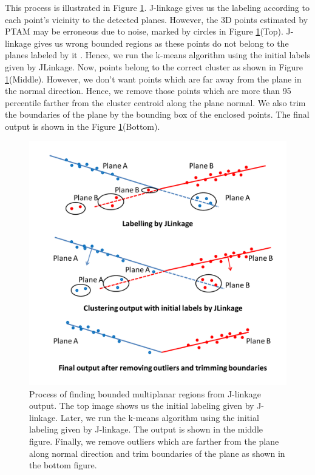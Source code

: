This process is illustrated in Figure \ref{fig:multiplane}. J-linkage
gives us the labeling according to each point's vicinity to the detected
planes. However, the 3D points estimated by PTAM may be erroneous due to noise,
marked by circles in Figure \ref{fig:multiplane}(Top). J-linkage gives us wrong bounded
regions as these points do not belong to the planes labeled by it . Hence, we
run the k-means algorithm using the initial labels given by JLinkage. Now, points  
belong to the correct cluster as shown in Figure \ref{fig:multiplane}(Middle). 
However, we don't want points which are far away from the plane in the normal direction.
Hence, we remove those points which are more than 95 percentile farther from the cluster 
centroid along the plane normal. We also trim the boundaries of the plane by
the bounding box of the enclosed points. The final output is shown in the
Figure \ref{fig:multiplane}(Bottom).

\begin{figure}[h!]
\centering
\includegraphics[width=\linewidth]{figures/multiplanar/multiplaneDetection}
\caption[Process of finding bounded multiplanar regions from J-linkage
output.]{Process of finding bounded multiplanar regions from J-linkage output.
The top image shows us the initial labeling given by J-linkage. Later, we run
the k-means algorithm using the initial labeling given by J-linkage. The output
is shown in the middle figure. Finally, we remove outliers which are farther
from the plane along normal direction and trim boundaries of the plane as shown
in the bottom figure.}
\label{fig:multiplane}
\end{figure}

